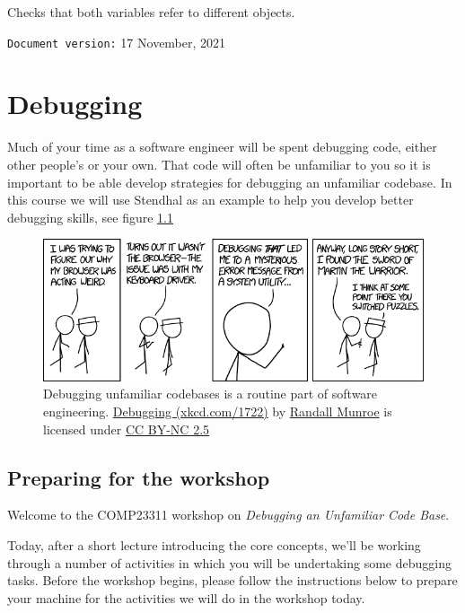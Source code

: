 \documentclass[
]{book}
\begin{document}
Checks that both variables refer to different objects.

\texttt{Document\ version:} 17 November, 2021

\hypertarget{debugging}{%
\chapter{Debugging}\label{debugging}}

Much of your time as a software engineer will be spent debugging code, either other people's or your own. That code will often be unfamiliar to you so it is important to be able develop strategies for debugging an unfamiliar codebase. In this course we will use Stendhal as an example to help you develop better debugging skills, see figure \ref{fig:xkcd-debugging-fig}

\begin{figure}

{\centering \includegraphics[width=0.99\linewidth]{images/debugging} 

}

\caption{Debugging unfamiliar codebases is a routine part of software engineering. \href{https://xkcd.com/1722/}{Debugging (xkcd.com/1722)} by \href{https://en.wikipedia.org/wiki/Randall_Munroe}{Randall Munroe} is licensed under \href{https://creativecommons.org/licenses/by-nc/2.5/}{CC BY-NC 2.5}}\label{fig:xkcd-debugging-fig}
\end{figure}



\hypertarget{preparing-for-the-workshop}{%
\section{Preparing for the workshop}\label{preparing-for-the-workshop}}

Welcome to the COMP23311 workshop on \emph{Debugging an Unfamiliar Code Base}.

Today, after a short lecture introducing the core concepts, we'll be working through a number of activities in which you will be undertaking some debugging tasks. Before the workshop begins, please follow the instructions below to prepare your machine for the activities we will do in the workshop today.
\end{document}
